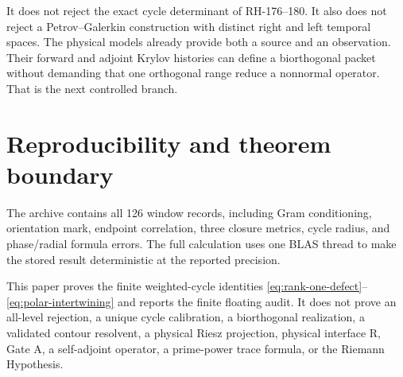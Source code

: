 \documentclass[12pt]{article}
\theoremstyle{remark}
\begin{document}
It does not reject the exact cycle determinant of RH-176--180.  It also does
not reject a Petrov--Galerkin construction with distinct right and left
temporal spaces.  The physical models already provide both a source and an
observation.  Their forward and adjoint Krylov histories can define a
biorthogonal packet without demanding that one orthogonal range reduce a
nonnormal operator.  That is the next controlled branch.

\section{Reproducibility and theorem boundary}

The archive contains all 126 window records, including Gram conditioning,
orientation mark, endpoint correlation, three closure metrics, cycle radius,
and phase/radial formula errors.  The full calculation uses one BLAS thread
to make the stored result deterministic at the reported precision.

This paper proves the finite weighted-cycle identities
\eqref{eq:rank-one-defect}--\eqref{eq:polar-intertwining} and reports the
finite floating audit.  It does not prove an all-level rejection, a unique
cycle calibration, a biorthogonal realization, a validated contour
resolvent, a physical Riesz projection, physical interface R, Gate A, a
self-adjoint operator, a prime-power trace formula, or the Riemann
Hypothesis.



\end{document}
